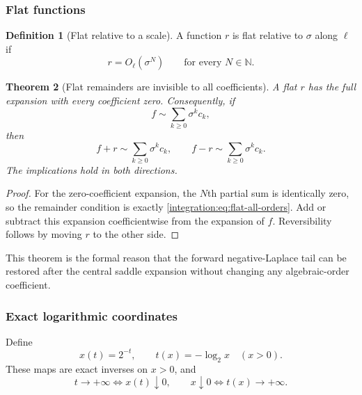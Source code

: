 \documentclass[11pt,oneside]{article}
\newtheorem{theorem}{Theorem}[section]
\theoremstyle{definition}
\newtheorem{definition}[theorem]{Definition}
\theoremstyle{remark}
\newcommand{\N}{\mathbb N}
\begin{document}
\subsubsection{Flat functions}

\begin{definition}[Flat relative to a scale]
\label{integration:def:flat-scale}
A function $r$ is flat relative to $\sigma$ along $\ell$ if
\begin{equation}
 r=O_{\ell}(\sigma^N)
 \qquad\text{for every }N\in\N.
 \label{integration:eq:flat-all-orders}
\end{equation}
\end{definition}

\begin{theorem}[Flat remainders are invisible to all coefficients]
\label{integration:thm:flat-invisible}
A flat $r$ has the full expansion with every coefficient zero.  Consequently, if
\begin{equation}
 f\sim\sum_{k\ge0}\sigma^kc_k,
 \label{integration:eq:f-exp-before-flat}
\end{equation}
then
\begin{equation}
 f+r\sim\sum_{k\ge0}\sigma^kc_k,
 \qquad
 f-r\sim\sum_{k\ge0}\sigma^kc_k.
 \label{integration:eq:flat-preserves-expansion}
\end{equation}
The implications hold in both directions.
\end{theorem}

\begin{proof}
For the zero-coefficient expansion, the $N$th partial sum is identically zero, so the
remainder condition is exactly \eqref{integration:eq:flat-all-orders}.  Add or subtract this expansion
coefficientwise from the expansion of $f$.  Reversibility follows by moving $r$ to the other
side.
\end{proof}

This theorem is the formal reason that the forward negative-Laplace tail can be restored
after the central saddle expansion without changing any algebraic-order coefficient.

\subsubsection{Exact logarithmic coordinates}

Define
\begin{equation}
 x(t)=2^{-t},
 \qquad
 t(x)=-\log_2x
 \quad(x>0).
 \label{integration:eq:small-log-coordinates}
\end{equation}
These maps are exact inverses on $x>0$, and
\begin{equation}
 t\to+\infty\iff x(t)\downarrow0,
 \qquad
 x\downarrow0\iff t(x)\to+\infty.
 \label{integration:eq:coordinate-filter-equivalence}
\end{equation}
\end{document}
